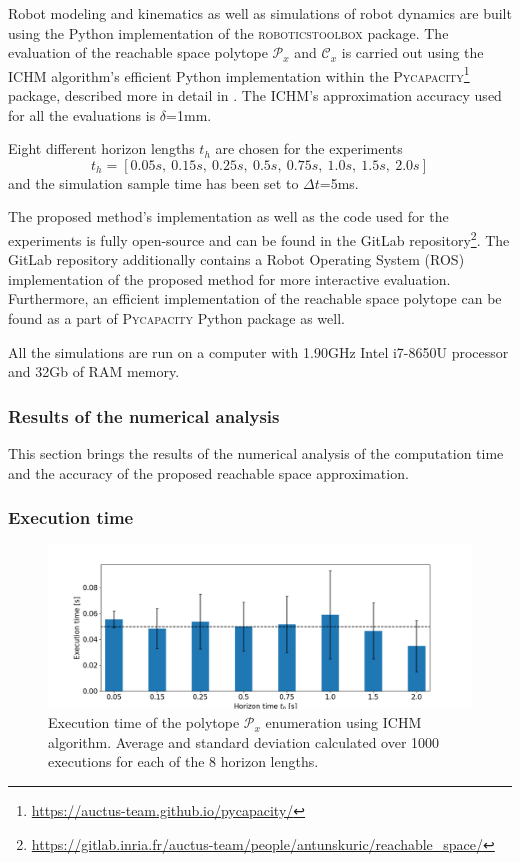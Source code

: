 Robot modeling and kinematics as well as simulations of robot dynamics are built using the Python implementation of the \textsc{roboticstoolbox} \cite{rtb} package. 
The evaluation of the reachable space polytope $\mathcal{P}_x$ and $\mathcal{C}_x$ is carried out using the ICHM algorithm's efficient Python implementation within the \textsc{Pycapacity}\footnote{\url{https://auctus-team.github.io/pycapacity/}} package, described more in detail in . The ICHM's approximation accuracy used for all the evaluations is $\delta$=1mm.

Eight different horizon lengths $t_h$ are chosen for the experiments
$$
t_h = [0.05s, ~ 0.15s, ~ 0.25s, ~ 0.5s,~ 0.75s,~ 1.0s,~ 1.5s, ~ 2.0s]
$$
and the simulation sample time has been set to $\Delta t$=5ms. 

The proposed method's implementation as well as the code used for the experiments is fully open-source and can be found in the GitLab repository\footnote{\url{https://gitlab.inria.fr/auctus-team/people/antunskuric/reachable_space/}}. The GitLab repository additionally contains a Robot Operating System (ROS) \cite{ros} implementation of the proposed method for more interactive evaluation. Furthermore, an efficient implementation of the reachable space polytope can be found as a part of \textsc{Pycapacity} Python package as well.

All the simulations are run on a computer with 1.90GHz Intel i7-8650U processor and 32Gb of RAM memory.
 
\subsubsection{Results of the numerical analysis}
\label{ch:results}

This section brings the results of the numerical analysis of the computation time and the accuracy of the proposed reachable space approximation.

\subsubsection*{Execution time}

\begin{figure}[!t]
    \centering
    \includegraphics[width=\linewidth]{Papers/images/time.png}
    
    \caption{Execution time of the polytope $\mathcal{P}_x$ enumeration using ICHM algorithm. Average and standard deviation calculated over 1000 executions for each of the 8 horizon lengths.}
    \label{fig:exec_time}

\end{figure}

